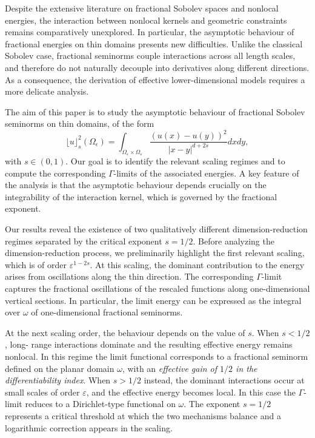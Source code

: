 \documentclass[11pt]{article}
\def\e{\varepsilon}
\begin{document}
Despite the extensive literature on fractional Sobolev spaces and nonlocal energies, the interaction between nonlocal kernels and geometric constraints remains comparatively unexplored. In particular, the asymptotic behaviour of fractional energies on thin domains presents new difficulties. Unlike the classical Sobolev case, fractional seminorms couple interactions across all length scales, and therefore do not naturally decouple into derivatives along different directions. As a consequence, the derivation of effective lower-dimensional models requires a more delicate analysis.

The aim of this paper is to study the asymptotic behaviour of fractional Sobolev seminorms on thin domains, of the form
\begin{equation}\label{intro-5}
\lfloor u\rfloor^2_{s}(\Omega_{\epsilon})=\int_{\Omega_\e\times\Omega_\e}\frac{(u(x)-u(y))^2}{|x-y|^{d+2s}}dx dy,
\end{equation}
with $s\in(0,1)$. Our goal is to identify the relevant scaling regimes and to compute the
corresponding $\Gamma$-limits of the associated energies. A key feature of the analysis is that the asymptotic behaviour depends crucially on the integrability of the interaction kernel, which is governed by the fractional exponent.

Our results reveal the existence of two qualitatively different dimension-reduction
re\-gimes separated by the critical exponent $s = 1/2$. Before analyzing the dimension-reduction
 process, we preliminarily highlight the first relevant scaling, which
is of order $\e^{1-2s}$. At this scaling, the dominant contribution to the energy arises from oscillations along the thin direction. The corresponding $\Gamma$-limit captures the fractional oscillations of the rescaled functions along one-dimensional vertical sections. In particular, the limit energy can be expressed as the integral over $\omega$ of one-dimensional fractional seminorms.

At the next scaling order, the behaviour depends on the value of $s$. When $s<1/2$, long-
range interactions dominate and the resulting effective energy remains nonlocal. In this
regime the limit functional corresponds to a fractional seminorm defined on the planar
domain $\omega$, with an {\em effective gain of $1/2$ in the differentiability index}. When $s>1/2$
instead, the dominant interactions occur at small scales of order $\e$, and the effective
energy becomes local. In this case the $\Gamma$-limit reduces to a Dirichlet-type functional on
$\omega$. The exponent $s=1/2$ represents a critical threshold at which the two mechanisms
balance and a logarithmic correction appears in the scaling. 
\end{document}
